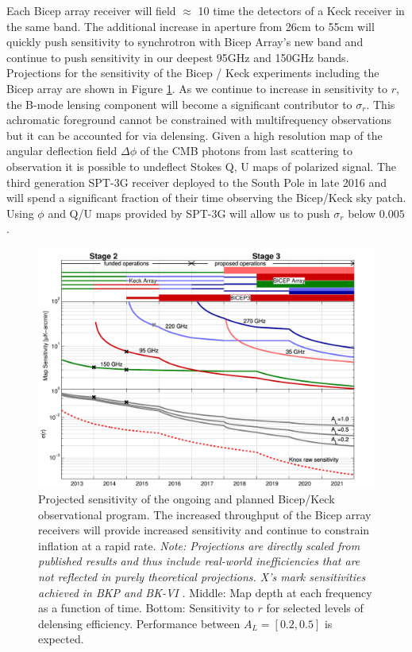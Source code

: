 \documentclass[12pt]{article}
\begin{document}
Each Bicep array receiver will field $\approx$ 10 time the detectors of a Keck
receiver in the same band. The additional increase in aperture from 26cm to
55cm will quickly push sensitivity to synchrotron with Bicep Array's new band
and continue to push sensitivity in our deepest 95GHz and 150GHz bands.
Projections for the sensitivity of the Bicep / Keck experiments including the
Bicep array are shown in Figure \ref{fig:projections}. As we continue to
increase in sensitivity to $r$, the B-mode lensing component will become a
significant contributor to $\sigma _r$. This achromatic foreground cannot be
constrained with multifrequency observations but it can be accounted for via
delensing. Given a high resolution map of the angular deflection field $\Delta
\phi$ of the CMB photons from last scattering to observation it is possible to
undeflect Stokes Q, U maps of polarized signal. The third generation SPT-3G
receiver deployed to the South Pole in late 2016 and will spend a significant
fraction of their time observing the Bicep/Keck sky patch. Using $\phi$ and
Q/U maps provided by SPT-3G will allow us to push $\sigma _r$ below $0.005$.



\begin{figure}[ht]
	\center
	\includegraphics[width=.6\textwidth]{bk_projections.pdf}
	\caption{Projected sensitivity of the ongoing and planned Bicep/Keck
	observational program. The increased throughput of the Bicep array
	receivers will provide increased sensitivity and continue to constrain
	inflation at a rapid rate. \textit{Note: Projections are directly scaled
	from published results and thus include real-world inefficiencies that are
	not reflected in purely theoretical projections. X's mark sensitivities
	achieved in BKP and BK-VI \cite{BK6, cite:BKP}}. Middle: Map depth at each
	frequency as a function of time. Bottom: Sensitivity to $r$ for selected
	levels of delensing efficiency. Performance between $A_L = [0.2, 0.5]$ is
	expected.}
	\label{fig:projections}
\end{figure}
\end{document}
